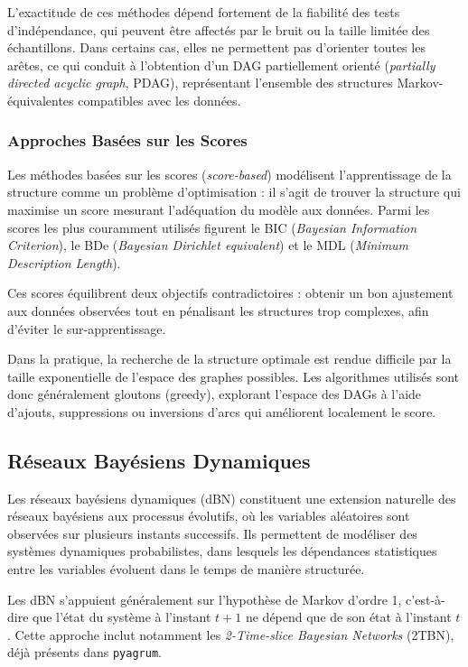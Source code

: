 \documentclass{article}
\begin{document}
L'exactitude de ces méthodes dépend fortement de la fiabilité des tests d'indépendance, qui peuvent être
affectés par le bruit ou la taille limitée des échantillons. Dans certains cas, elles ne permettent pas d'orienter
toutes les arêtes, ce qui conduit à l'obtention d'un DAG partiellement orienté (\textit{partially directed acyclic graph},
PDAG), représentant l'ensemble des structures Markov-équivalentes compatibles avec les données.

\subsubsection{Approches Basées sur les Scores}

Les méthodes basées sur les scores (\textit{score-based}) modélisent l'apprentissage de la structure comme un
problème d'optimisation : il s'agit de trouver la structure qui maximise un score mesurant l'adéquation du
modèle aux données. Parmi les scores les plus couramment utilisés figurent le BIC (\textit{Bayesian Information Criterion}),
le BDe (\textit{Bayesian Dirichlet equivalent}) et le MDL (\textit{Minimum Description Length}).

Ces scores équilibrent deux objectifs contradictoires : obtenir un bon ajustement aux données observées tout en
pénalisant les structures trop complexes, afin d'éviter le sur-apprentissage.

Dans la pratique, la recherche de la structure optimale est rendue difficile par la taille exponentielle de l'espace
des graphes possibles. Les algorithmes utilisés sont donc généralement gloutons (greedy), explorant l'espace des
DAGs à l'aide d'ajouts, suppressions ou inversions d'arcs qui améliorent localement le score.

\subsection{Réseaux Bayésiens Dynamiques}

Les réseaux bayésiens dynamiques (dBN) constituent une extension naturelle des réseaux bayésiens aux processus
évolutifs, où les variables aléatoires sont observées sur plusieurs instants successifs. Ils permettent de modéliser
des systèmes dynamiques probabilistes, dans lesquels les dépendances statistiques entre les variables évoluent dans
le temps de manière structurée.

Les dBN s'appuient généralement sur l'hypothèse de Markov d'ordre 1, c'est-à-dire que l'état du système à l'instant
$t+1$ ne dépend que de son état à l'instant $t$. Cette approche inclut notamment les \textit{2-Time-slice Bayesian Networks}
(2TBN), déjà présents dans \texttt{pyagrum}.
\end{document}
